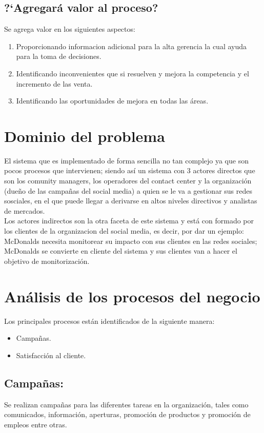 \subsection{?`Agregar\'a valor al proceso?}
Se agrega valor en los siguientes aspectos:%
\begin{enumerate}
	\item Proporcionando informacion adicional para la alta gerencia la cual ayuda para la toma de decisiones.
	\item Identificando inconvenientes que si resuelven y mejora la competencia y el incremento de las venta.
	\item Identificando las oportunidades de mejora en todas las \'areas.
\end{enumerate}%
%
\section{Dominio del problema}
El sistema que es implementado de forma sencilla no tan complejo ya que son pocos procesos que intervienen; siendo as\'i un sistema con 3 actores directos que son los comunity managers, los operadores del contact center y la organizaci\'on (due\~no de las campa\~nas del social media) a quien se le va a gestionar sus redes sosciales, en el que puede llegar a derivarse en altos niveles directivos y analistas de mercados.%
\\%
Los actores indirectos son la otra faceta de este sistema y est\'a con formado por los clientes de la organizacion del social media, es decir, por dar un ejemplo: McDonalds necesita monitorear su impacto con sus clientes en las redes sociales; McDonalds se convierte en cliente del sistema y sus clientes van a hacer el objetivo de monitorizaci\'on.
%
%
\section{An\'alisis de los procesos del negocio}
Los principales procesos est\'an identificados de la siguiente manera:%
	\begin{itemize}
		\item Campa\~nas.
		\item Satisfacci\'on al cliente.
	\end{itemize}
\subsection{Campa\~nas:}
Se realizan campa\~nas para las diferentes tareas en la organizaci\'on, tales como comunicados, informaci\'on, aperturas, promoci\'on de productos y promoci\'on de empleos entre otras.%
%
